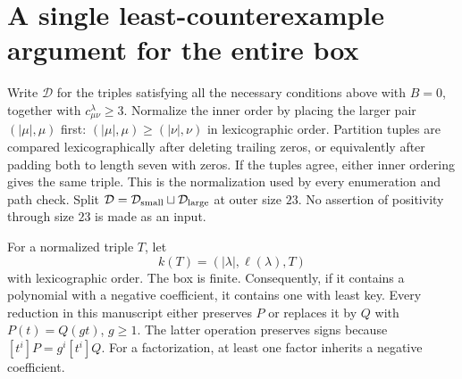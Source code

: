 \documentclass[11pt]{article}
\begin{document}
\section{A single least-counterexample argument for the entire box}
Write $\mathcal D$ for the triples satisfying all the necessary
conditions above with $B=0$, together with $c^\lambda_{\mu\nu}\ge3$.
Normalize the inner order by placing the larger pair
$(|\mu|,\mu)$ first: $(|\mu|,\mu)\ge(|\nu|,\nu)$
in lexicographic order. Partition tuples are compared lexicographically
after deleting trailing zeros, or equivalently after padding both to
length seven with zeros. If the tuples agree, either inner ordering gives the same
triple. This is the normalization used by every enumeration and path check.
Split $\mathcal D=\mathcal D_{\rm small}\sqcup\mathcal D_{\rm large}$
at outer size $23$. No assertion of positivity through size $23$
is made as an input.

For a normalized triple $T$, let
\[
 k(T)=(|\lambda|,\ell(\lambda),T)
\]
with lexicographic order. The box is finite. Consequently, if it
contains a polynomial with a negative coefficient, it contains one
with least key. Every reduction in this manuscript either preserves
$P$ or replaces it by $Q$ with $P(t)=Q(gt)$, $g\ge1$.
The latter operation preserves signs because $[t^i]P=g^i[t^i]Q$.
For a factorization, at least one factor inherits a negative coefficient.
\end{document}
